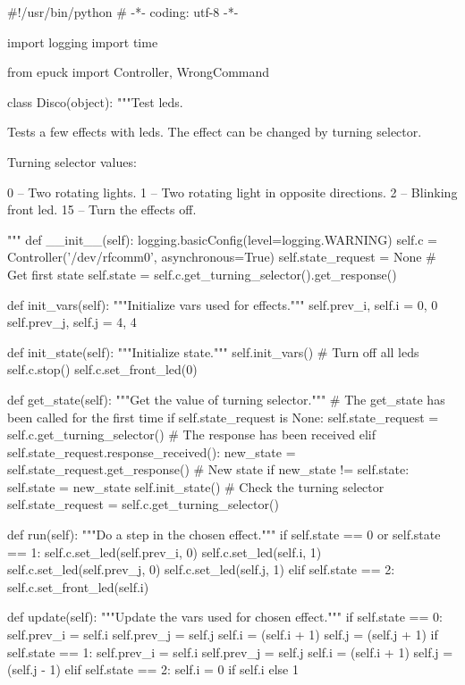 \begin{mylisting}
\begin{pyc}
#!/usr/bin/python
# -*- coding: utf-8 -*-

import logging
import time

from epuck import Controller, WrongCommand

class Disco(object):
    """Test leds.

    Tests a few effects with leds.
    The effect can be changed by turning selector.

    Turning selector values:

        0 -- Two rotating lights.
        1 -- Two rotating light in opposite directions.
        2 -- Blinking front led.
        15 -- Turn the effects off.

    """
    def __init__(self):
        logging.basicConfig(level=logging.WARNING)
        self.c = Controller('/dev/rfcomm0', asynchronous=True)
        self.state_request = None
        # Get first state
        self.state = self.c.get_turning_selector().get_response()

    def init_vars(self):
        """Initialize vars used for effects."""
        self.prev_i, self.i = 0, 0
        self.prev_j, self.j = 4, 4

    def init_state(self):
        """Initialize state."""
        self.init_vars()
        # Turn off all leds
        self.c.stop()
        self.c.set_front_led(0)

    def get_state(self):
        """Get the value of turning selector."""
        # The get_state has been called for the first time
        if self.state_request is None:
            self.state_request = self.c.get_turning_selector()
        # The response has been received
        elif self.state_request.response_received():
            new_state = self.state_request.get_response()
            # New state
            if new_state != self.state:
                self.state = new_state
                self.init_state()
            # Check the turning selector
            self.state_request = self.c.get_turning_selector()

    def run(self):
        """Do a step in the chosen effect."""
        if self.state == 0 or self.state == 1:
            self.c.set_led(self.prev_i, 0)
            self.c.set_led(self.i, 1)
            self.c.set_led(self.prev_j, 0)
            self.c.set_led(self.j, 1)
        elif self.state == 2:
            self.c.set_front_led(self.i)

    def update(self):
        """Update the vars used for chosen effect."""
        if self.state == 0:
            self.prev_i = self.i
            self.prev_j = self.j
            self.i = (self.i + 1) %
            self.j = (self.j + 1) %
        if self.state == 1:
            self.prev_i = self.i
            self.prev_j = self.j
            self.i = (self.i + 1) %
            self.j = (self.j - 1) %
        elif self.state == 2:
            self.i = 0 if self.i else 1


\end{pyc}
\end{mylisting}
